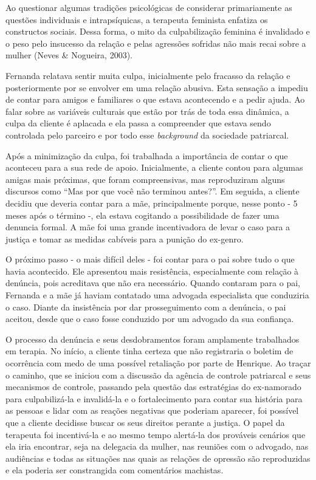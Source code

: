 Ao questionar algumas tradições psicológicas de considerar primariamente as questões individuais e intrapsíquicas, a terapeuta feminista enfatiza os constructos sociais. Dessa forma, o mito da culpabilização feminina é invalidado e o peso pelo insucesso da relação e pelas agressões sofridas não mais recai sobre a mulher (Neves \& Nogueira, 2003).

Fernanda relatava sentir muita culpa, inicialmente pelo fracasso da relação e posteriormente por se envolver em uma relação abusiva. Esta sensação a impediu de contar para amigos e familiares o que estava acontecendo e a pedir ajuda. Ao falar sobre as variáveis culturais que estão por trás de toda essa dinâmica, a culpa da cliente é aplacada e ela passa a compreender que estava sendo controlada pelo parceiro e por todo esse \textit{background} da sociedade patriarcal.

Após a minimização da culpa, foi trabalhada a importância de contar o que aconteceu para a sua rede de apoio. Inicialmente, a cliente contou para algumas amigas mais próximas, que foram compreensivas, mas reproduziram alguns discursos como ``Mas por que você não terminou antes?''. Em seguida, a cliente decidiu que deveria contar para a mãe, principalmente porque, nesse ponto - 5 meses após o término -, ela estava cogitando a possibilidade de fazer uma denuncia formal. A mãe foi uma grande incentivadora de levar o caso para a justiça e tomar as medidas cabíveis para a punição do ex-genro.

O próximo passo - o mais difícil deles - foi contar para o pai sobre tudo o que havia acontecido. Ele apresentou mais resistência, especialmente com relação à denúncia, pois acreditava que não era necessário. Quando contaram para o pai, Fernanda e a mãe já haviam contatado uma advogada especialista que conduziria o caso. Diante da insistência por dar prosseguimento com a denúncia, o pai aceitou, desde que o caso fosse conduzido por um advogado da sua confiança. 

O processo da denúncia e seus desdobramentos foram amplamente trabalhados em terapia. No início, a cliente tinha certeza que não registraria o boletim de ocorrência com medo de uma possível retaliação por parte de Henrique. Ao traçar o caminho, que se iniciou com a discussão da agência de controle patriarcal e seus mecanismos de controle, passando pela questão das estratégias do ex-namorado para culpabilizá-la e invalidá-la e o fortalecimento para contar sua história para as pessoas e lidar com as reações negativas que poderiam aparecer, foi possível que a cliente decidisse buscar os seus direitos perante a justiça. O papel da terapeuta foi incentivá-la e ao mesmo tempo alertá-la dos prováveis cenários que ela iria encontrar, seja na delegacia da mulher, nas reuniões com o advogado, nas audiências e todas as situações nas quais as relações de opressão são reproduzidas e ela poderia ser constrangida com comentários machistas.

